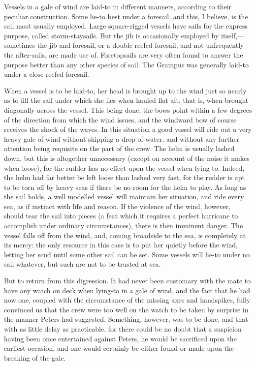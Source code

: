 Vessels in a gale of wind are laid-to in different manners, according to
their peculiar construction. Some lie-to best under a foresail, and this, I
believe, is the sail most usually employed. Large square-rigged vessels have
sails for the express purpose, called storm-staysails. But the jib is
occasionally employed by itself,---sometimes the jib and foresail, or a
double-reefed foresail, and not unfrequently the after-sails, are made use of.
Foretopsails are very often found to answer the purpose better than any other
species of sail. The Grampus was generally laid-to under a close-reefed
foresail. 

When a vessel is to be laid-to, her head is brought up to the wind just so
nearly as to fill the sail under which she lies when hauled flat aft, that is,
when brought diagonally across the vessel. This being done, the bows point
within a few degrees of the direction from which the wind issues, and the
windward bow of course receives the shock of the waves. In this situation a good
vessel will ride out a very heavy gale of wind without shipping a drop of water,
and without any further attention being requisite on the part of the crew. The
helm is usually lashed down, but this is altogether unnecessary (except on
account of the noise it makes when loose), for the rudder has no effect upon the
vessel when lying-to. Indeed, the helm had far better be left loose than lashed
very fast, for the rudder is apt to be torn off by heavy seas if there be no
room for the helm to play. As long as the sail holds, a well modelled vessel
will maintain her situation, and ride every sea, as if instinct with life and
reason. If the violence of the wind, however, should tear the sail into pieces
(a feat which it requires a perfect hurricane to accomplish under ordinary
circumstances), there is then imminent danger. The vessel falls off from the
wind, and, coming broadside to the sea, is completely at its mercy: the only
resource in this case is to put her quietly before the wind, letting her scud
until some other sail can be set. Some vessels will lie-to under no sail
whatever, but such are not to be trusted at sea. 

But to return from this digression. It had never been customary with the mate
to have any watch on deck when lying-to in a gale of wind, and the fact that he
had now one, coupled with the circumstance of the missing axes and handspikes,
fully convinced us that the crew were too well on the watch to be taken by
surprise in the manner Peters had suggested. Something, however, was to be done,
and that with as little delay as practicable, for there could be no doubt that a
suspicion having been once entertained against Peters, he would be sacrificed
upon the earliest occasion, and one would certainly be either found or made upon
the breaking of the gale. 

